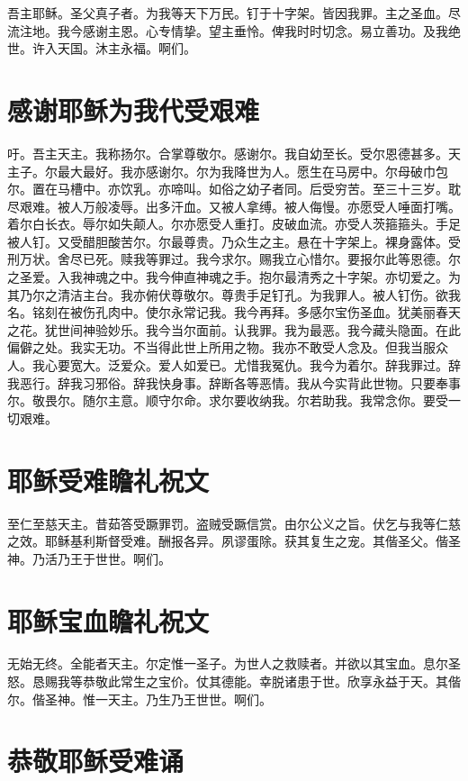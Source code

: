 \documentclass[UTF8,17pt]{ctexart}
\begin{document}
吾主耶稣。圣⽗真⼦者。为我等天下万民。钉于⼗字架。皆因我罪。主之圣⾎。尽流注地。我今感谢主恩。⼼专情挚。望主垂怜。俾我时时切念。易⽴善功。及我绝世。许⼊天国。沐主永福。啊们。

\section{感谢耶稣为我代受艰难}

吁。吾主天主。我称扬尔。合掌尊敬尔。感谢尔。我⾃幼⾄长。受尔恩德甚多。天主⼦。尔最⼤最好。我亦感谢尔。尔为我降世为⼈。愿⽣在马房中。尔母破⼱包尔。置在马槽中。亦饮乳。亦啼叫。如俗之幼⼦者同。后受穷苦。⾄三⼗三岁。耽尽艰难。被⼈万般凌辱。出多汗⾎。又被⼈拿缚。被⼈侮慢。亦愿受⼈唾⾯打嘴。着尔⽩长⾐。辱尔如失颠⼈。尔亦愿受⼈重打。⽪破⾎流。亦受⼈茨箍箍头。⼿⾜被⼈钉。⼜受醋胆酸苦尔。尔最尊贵。乃众⽣之主。悬在⼗字架上。裸⾝露体。受刑万状。舍尽已死。赎我等罪过。我今求尔。赐我⽴⼼惜尔。要报尔此等恩德。尔之圣爱。⼊我神魂之中。我今伸直神魂之⼿。抱尔最清秀之⼗字架。亦切爱之。为其乃尔之清洁主台。我亦俯伏尊敬尔。尊贵⼿⾜钉孔。为我罪⼈。被⼈钉伤。欲我名。铭刻在被伤孔⾁中。使尔永常记我。我今再拜。多感尔宝伤圣⾎。犹美丽春天之花。犹世间神验妙乐。我今当尔⾯前。认我罪。我为最恶。我今藏头隐⾯。在此偏僻之处。我实⽆功。不当得此世上所⽤之物。我亦不敢受⼈念及。但我当服众⼈。我⼼要宽⼤。泛爱众。爱⼈如爱已。尤惜我冤仇。我今为着尔。辞我罪过。辞我恶⾏。辞我习邪俗。辞我快⾝事。辞断各等恶情。我从今实背此世物。只要奉事尔。敬畏尔。随尔主意。顺守尔命。求尔要收纳我。尔若助我。我常念你。要受⼀切艰难。

\section{耶稣受难瞻礼祝⽂}

⾄仁⾄慈天主。昔茹答受蹶罪罚。盗贼受蹶信赏。由尔公义之旨。伏乞与我等仁慈之效。耶稣基利斯督受难。酬报各异。夙谬蛋除。获其复⽣之宠。其偕圣⽗。偕圣神。乃活乃王于世世。啊们。

\section{耶稣宝⾎瞻礼祝⽂}

⽆始⽆终。全能者天主。尔定惟⼀圣⼦。为世⼈之救赎者。并欲以其宝⾎。息尔圣怒。恳赐我等恭敬此常⽣之宝价。仗其德能。幸脱诸患于世。欣享永益于天。其偕尔。偕圣神。惟⼀天主。乃⽣乃王世世。啊们。

\section{恭敬耶稣受难诵}
\end{document}

